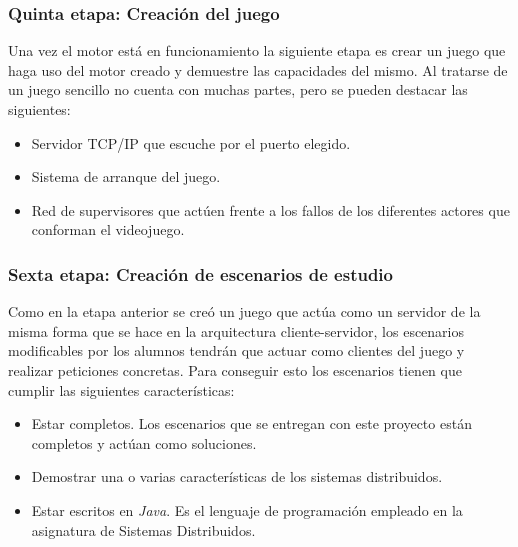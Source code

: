 \subsubsection{Quinta etapa: Creación del juego}
Una vez el motor está en funcionamiento la siguiente etapa es crear un juego que haga uso del motor creado y demuestre las capacidades del mismo. Al tratarse de un juego sencillo no cuenta con muchas partes, pero se pueden destacar las siguientes:
\\
\begin{itemize}
	\item Servidor TCP/IP que escuche por el puerto elegido.
	\item Sistema de arranque del juego.
	\item Red de supervisores que actúen frente a los fallos de los diferentes actores que conforman el videojuego.
\end{itemize}

\subsubsection{Sexta etapa: Creación de escenarios de estudio}
Como en la etapa anterior se creó un juego que actúa como un servidor de la misma forma que se hace en la arquitectura cliente-servidor, los escenarios modificables por los alumnos tendrán que actuar como clientes del juego y realizar peticiones concretas. Para conseguir esto los escenarios tienen que cumplir las siguientes características:
\\
\begin{itemize}
	\item Estar completos. Los escenarios que se entregan con este proyecto están completos y actúan como soluciones.
	\item Demostrar una o varias características de los sistemas distribuidos.
	\item Estar escritos en \textit{Java}. Es el lenguaje de programación empleado en la asignatura de Sistemas Distribuidos.
\end{itemize}
